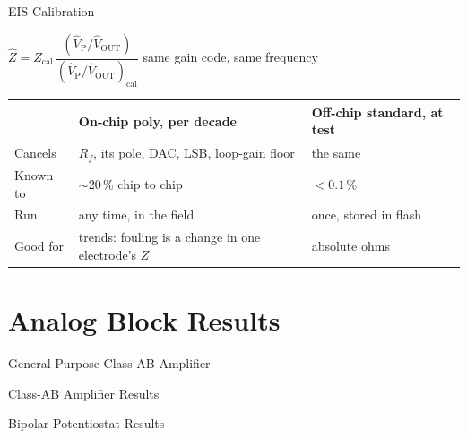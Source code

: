\documentclass[10pt, aspectratio=169]{beamer}
\begin{document}
\begin{frame}{EIS Calibration}
\centering
{\footnotesize
$\hat Z = Z_{\mathrm{cal}}\,\dfrac{(\hat V_{\mathrm{P}}/\hat V_{\mathrm{OUT}})}{(\hat V_{\mathrm{P}}/\hat V_{\mathrm{OUT}})_{\mathrm{cal}}}$ \quad same gain code, same frequency\par}
\vspace{0.4cm}

{\footnotesize
\begin{tabular}{@{}lll@{}}
\toprule
 & On-chip poly, per decade & Off-chip standard, at test \\
\midrule
Cancels     & $R_f$, its pole, DAC, LSB, loop-gain floor & the same \\
Known to    & $\sim$20\,\% chip to chip & $<0.1$\,\% \\
Run         & any time, in the field & once, stored in flash \\
Good for    & trends: fouling is a change in one electrode's $Z$ & absolute ohms \\
\bottomrule
\end{tabular}}
\end{frame}

\section{Analog Block Results}


\begin{frame}{General-Purpose Class-AB Amplifier}
\centering{}
\end{frame}



\begin{frame}{Class-AB Amplifier Results}
\centering
\resizebox{0.9\linewidth}{!}{}
\vspace{0.2cm}


\end{frame}

\begin{frame}{Bipolar Potentiostat Results}
\centering{}
\vspace{0.05cm}
\end{frame}
\end{document}
